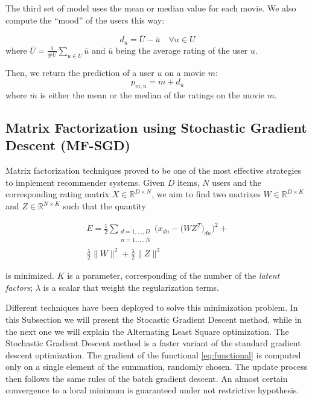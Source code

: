 \documentclass[10pt,conference,compsocconf]{IEEEtran}
\begin{document}
The third set of model uses the mean or median value for each movie. We also compute the ``mood'' of the users this way:

\begin{equation}
 d_u = \overline{U} - \overline{u} \quad \forall u\in U
\end{equation}
where $\overline{U} = \frac{1}{\#U} \sum_{u\in U} \overline{u}$ and $\overline{u}$ being the average rating of the user $u$.

Then, we return the prediction of a user $u$ on a movie $m$:
\begin{equation}
 p_{m,u} = \overline{m} + d_u
\end{equation}
where $\overline{m}$ is either the mean or the median of the ratings on the movie $m$.

\subsection{Matrix Factorization using Stochastic Gradient Descent (MF-SGD)}
\label{sec:mf-sgd}
Matrix factorization techniques proved to be one of the most effective strategies to implement 
recommender systems. Given $D$ items, $N$ users and the corresponding rating matrix 
$X \in \mathbb{R}^{D \times N}$, we aim to find two matrixes $W \in \mathbb{R}^{D \times K}$ and $Z
\in \mathbb{R}^{N \times K}$ such that the quantity 

\begin{multline}
\label{eq:functional}
E = \frac{1}{2} \sum_{\substack{d=1,...,D \\n=1,...,N}} 
\bigg( x_{dn} - \big( WZ^T \big)_{dn} \bigg) ^2 + \\ 
\frac{\lambda}{2}\|W\|^2 + \frac{\lambda}{2}\|Z\|^2
\end{multline} 

is minimized. $K$ is a parameter,
corresponding of the number of the \textit{latent factors}; $\lambda$ is a scalar 
that weight the regularization terms.

Different techniques have been deployed to solve this minimization problem. In this Subsection we
will present the Stocastic Gradient Descent method, while in the next one we will explain the
Alternating Least Square optimization. 
The Stochastic Gradient Descent method is a faster variant of the standard gradient descent
optimization. The gradient of the functional \ref{eq:functional} is computed only on a single
element of the summation, randomly chosen. The update process then follows the same rules of the batch
gradient descent.
An almost certain convergence to a local minimum is guaranteed under not restrictive hypothesis.
\end{document}

